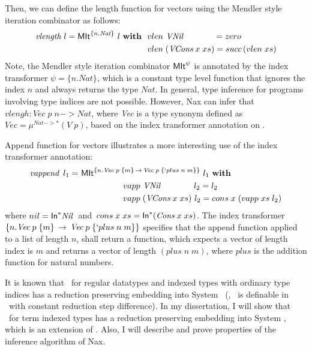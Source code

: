 Then, we can define the length function for vectors using the Mendler style
iteration combinator as follows:
\begin{align*}
\textit{vlength}~l = \textsf{MIt}^{\{n . \textit{Nat}\}}~l~\textbf{with}~~
&  vlen ~\textit{VNil}~~~~~~~~~~~ = zero \\
&  vlen \;(\textit{VCons}\;x\;xs) = succ\,(vlen\;xs)
\end{align*}
Note, the Mendler style iteration combinator $\textsf{MIt}^\psi$ is annotated by
the index transformer $\psi = \{n . \textit{Nat}\}$, which is a constant
type level function that ignores the index $n$ and always returns the 
type $\textit{Nat}$. In general, type inference for programs involving
type indices are not possible. However, Nax can infer that
$vlengh : \textit{Vec}\;p\;n -> \textit{Nat}$, where
\textit{Vec} is a type synonym defined as
$\textit{Vec} = \mu^{\textit{Nat} -> *}(V\;p)$, based on the index transformer
annotation on \MIt.

Append function for vectors illustrates a more interesting use of
the index transformer annotation:
\begin{align*}
\textit{vappend}~\,l_1 =~ &
 \textsf{MIt}^{\{n . \textit{Vec}\;p\;\{m\} \, -> \, \textit{Vec}\;p\;\{`plus\;n\;m\}\}}~l_1
 ~\textbf{with} \\
&\qquad\qquad\quad  vapp ~\textit{VNil}~~~~~~~~~~~ ~ l_2 = l_2 \\
&\qquad\qquad\quad  vapp \;(\textit{VCons}\;x\;xs) ~ l_2 = cons\;x\;(vapp\;xs\;l_2)
\end{align*}
where $nil = \textsf{In}^{*} \textit{Nil}\;$ and
$\,cons\;x\;xs = \textsf{In}^{*}(\textit{Cons}\;x\;xs)$.
The index transformer
$\{n . \textit{Vec}\;p\;\{m\} \, -> \, \textit{Vec}\;p\;\{`plus\;n\;m\}\}$
specifies that the append function applied to a list of length $n$,
shall return a function, which expects a vector of length index is $m$
and returns a vector of length $(plus\;n\;m)$, where $plus$ is the addition
function for natural numbers.

It is known that \MIt\ for regular datatypes and indexed types with ordinary
type indices has a reduction preserving embedding into System \Fw\ (\ie, \MIt\
is definable in \Fw\ with constant reduction step difference).
In my dissertation, I will show that \MIt\ for term indexed types has a
reduction preserving embedding into System \Fi, which is an extension of \Fw.
Also, I will describe and prove properties of the inference algorithm of Nax.

